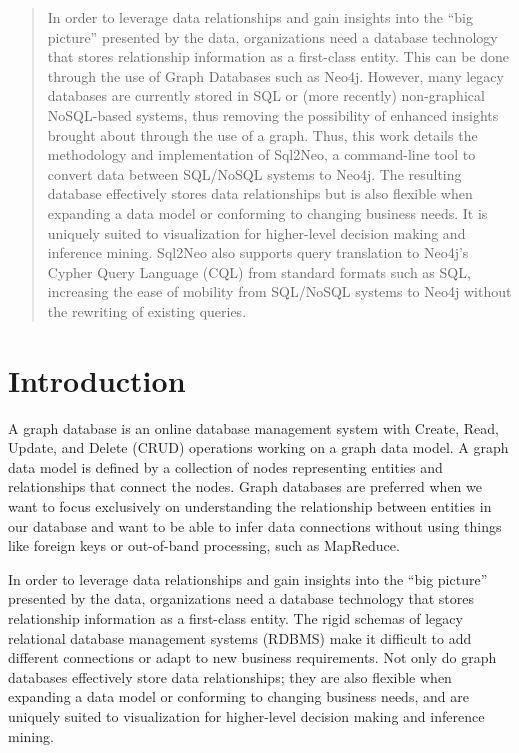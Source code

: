 \documentclass[12pt]{article}
\newcommand{\sectionfontstyle}{\fontsize{16pt}{1em}\usefont{T1}{phv}{b}{n}}
\begin{document}
    \begin{abstract}
        In order to leverage data relationships and gain insights into the ``big picture'' presented by the data, organizations need a database technology that stores relationship information as a first-class entity. This can be done through the use of Graph Databases such as Neo4j. However, many legacy databases are currently stored in SQL or (more recently) non-graphical NoSQL-based systems, thus removing the possibility of enhanced insights brought about through the use of a graph. Thus, this work details the methodology and implementation of Sql2Neo, a command-line tool to convert data between SQL/NoSQL systems to Neo4j. The resulting database effectively stores data relationships but is also flexible when expanding a data model or conforming to changing business needs. It is uniquely suited to visualization for higher-level decision making and inference mining. Sql2Neo also supports query translation to Neo4j’s Cypher Query Language (CQL) from standard formats such as SQL, increasing the ease of mobility from SQL/NoSQL systems to Neo4j without the rewriting of existing queries. 
    \end{abstract}

    \newpage

    \tableofcontents

    \newpage


    \section{\sectionfontstyle Introduction}
    A graph database is an online database management system with Create, Read, Update, and Delete (CRUD) operations working on a graph data model. A graph data model is defined by a collection of nodes representing entities and relationships that connect the nodes. Graph databases are preferred when we want to focus exclusively on understanding the relationship between entities in our database and want to be able to infer data connections without using things like foreign keys or out-of-band processing, such as MapReduce. 

    In order to leverage data relationships and gain insights into the ``big picture'' presented by the data, organizations need a database technology that stores relationship information as a first-class entity. The rigid schemas of legacy relational database management systems (RDBMS) make it difficult to add different connections or adapt to new business requirements. Not only do graph databases effectively store data relationships; they are also flexible when expanding a data model or conforming to changing business needs, and are uniquely suited to visualization for higher-level decision making and inference mining.
\end{document}
